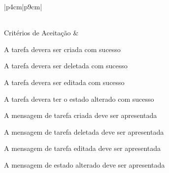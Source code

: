\begin{tabela}{|p{4cm}|p{9cm}|}
\begin{enumalfa}
    \end{enumalfa}\\
    \hline
    Critérios de Aceitação &
    \begin{enumalfa}
        \item A tarefa devera ser criada com sucesso
        \item A tarefa devera ser deletada com sucesso
        \item A tarefa devera ser editada com sucesso
        \item A tarefa devera ter o estado alterado com sucesso
        \item A mensagem de tarefa criada deve ser apresentada
        \item A mensagem de tarefa deletada deve ser apresentada
        \item A mensagem de tarefa editada deve ser apresentada
        \item A mensagem de estado alterado deve ser apresentada
    \end{enumalfa}\\
    \hline
\end{tabela}

